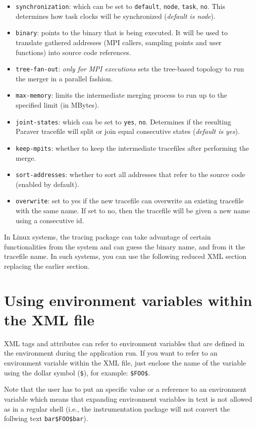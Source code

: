 \begin{itemize}
 \item {\tt synchronization}: which can be set to {\tt default}, {\tt node}, {\tt task}, {\tt no}. This determines how task clocks will be synchronized ({\em default is node}).
 \item {\tt binary}: points to the binary that is being executed. It will be used to translate gathered addresses (MPI callers, sampling points and user functions) into source code references.
 \item {\tt tree-fan-out}: {\em only for MPI executions} sets the tree-based topology to run the merger in a parallel fashion.
 \item {\tt max-memory}: limits the intermediate merging process to run up to the specified limit (in MBytes).
 \item {\tt joint-states}: which can be set to {\tt yes}, {\tt no}. Determines if the resulting Paraver tracefile will split or join equal consecutive states ({\em default is yes}).
 \item {\tt keep-mpits}: whether to keep the intermediate tracefiles after performing the merge.
 \item {\tt sort-addresses}: whether to sort all addresses that refer to the source code (enabled by default).
 \item {\tt overwrite}: set to yes if the new tracefile can overwrite an existing tracefile with the same name. If set to no, then the tracefile will be given a new name using a consecutive id.
\end{itemize}

In Linux systems, the tracing package can take advantage of certain functionalities from the system and can guess the binary name, and from it the tracefile name. In such systems, you can use the following reduced XML section replacing the earlier section.




\section{Using environment variables within the XML file}\label{sec:EnvVars_in_XML}

XML tags and attributes can refer to environment variables that are defined in the environment during the application run. If you want to refer to an environment variable within the XML file, just enclose the name of the variable using the dollar symbol ({\tt \$}), for example: {\tt \$FOO\$}.

Note that the user has to put an specific value or a reference to an environment variable which means that expanding environment variables in text is not allowed as in a regular shell (i.e., the instrumentation package will not convert the follwing text {\tt bar\$FOO\$bar}).

